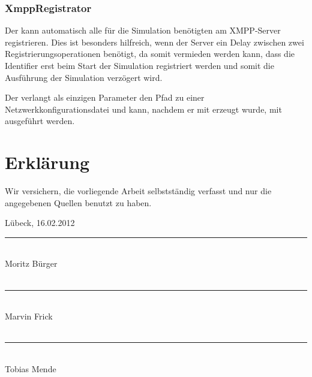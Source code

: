 \subsection{XmppRegistrator}
Der  kann automatisch alle für die Simulation benötigten  am XMPP-Server registrieren. Dies ist besonders hilfreich, wenn der Server ein Delay zwischen zwei Registrierungsoperationen benötigt, da somit vermieden werden kann, dass die Identifier erst beim Start der Simulation registriert werden und somit die Ausführung der Simulation verzögert wird.

Der  verlangt als einzigen Parameter den Pfad zu einer Netzwerkkonfigurationsdatei und kann, nachdem er mit  erzeugt wurde, mit  ausgeführt werden.

\chapter*{Erklärung}
\thispagestyle{empty}
Wir versichern, die vorliegende Arbeit selbstständig verfasst und nur die
angegebenen Quellen benutzt zu haben.


\vspace*{5cm}
Lübeck, 16.02.2012 \hspace*{1cm} \rule{0.3\textwidth}{0.4pt}\\
\hspace*{14.5em}Moritz Bürger\\
\vspace*{2cm}\\
\hspace*{11.1em}\rule{0.3\textwidth}{0.4pt}\\
\hspace*{14.5em}Marvin Frick\\
\vspace*{2cm}\\
\hspace*{11.1em}\rule{0.3\textwidth}{0.4pt}\\
\hspace*{14.5em}Tobias Mende\\